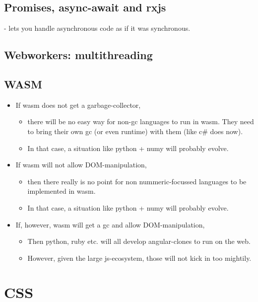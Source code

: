 \subsection{Promises, async-await and rxjs}
 -  lets you handle asynchronous code as if it was synchronous. 

\subsection{Webworkers: multithreading}


\subsection{WASM}
\begin{itemize}
    \item If wasm does not get a garbage-collector, 
        \begin{itemize}
            \item there will be no easy way for non-gc languages to run in wasm. They need to bring their own gc (or even runtime) with them (like c\# does now). 
            \item In that case, a situation like python + numy will probably evolve.
        \end{itemize}
    \item If wasm will not allow DOM-manipulation, 
        \begin{itemize}
            \item then there really is no point for non nummeric-focussed languages to be implemented in wasm.
            \item In that case, a situation like python + numy will probably evolve.
        \end{itemize}
    \item If, however, wasm will get a gc and allow DOM-manipulation, 
        \begin{itemize}
            \item Then python, ruby etc. will all develop angular-clones to run on the web. 
            \item However, given the large js-ecosystem, those will not kick in too mightily. 
        \end{itemize}
\end{itemize}


\section{CSS}


